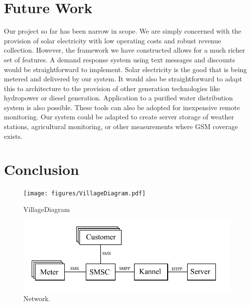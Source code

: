 \documentclass[conference]{IEEEtran}
\begin{document}
\section{Future Work}
Our project so far has been narrow in scope.  We are simply concerned with the
provision of solar electricity with low operating costs and robust revenue 
collection.  However, the framework we have constructed allows for a much 
richer set of features.  
A demand response system using text messages and discounts
would be straightforward to implement.  
Solar electricity is the good that is being metered and delivered by our
system.  It would also be straightforward to adapt this to architecture
to the provision of other generation technologies like hydropower or 
diesel generation.  Application to a purified water distribution system
is also possible.  
These tools can also be adopted for inexpensive remote monitoring.  Our 
system could be adapted to create server storage of weather stations, 
agricultural monitoring, or other measurements where GSM coverage exists.


\section{Conclusion}


\begin{figure}[]
\begin{center}
\texttt{[image: figures/VillageDiagram.pdf]}
\end{center}
\caption{VillageDiagram}
\label{ShedWiringDiagram}
\end{figure}


\begin{figure}[]
\begin{center}
\includegraphics[width=\columnwidth]{figures/NetworkDiagram.pdf}
\end{center}
\caption{Network.}
\label{SoftwareDiagram}
\end{figure}
\end{document}
